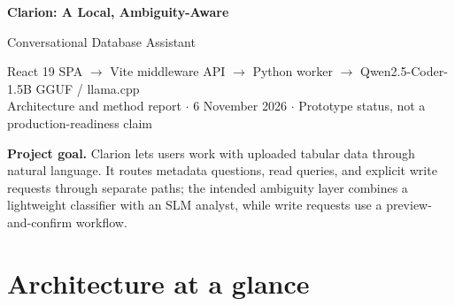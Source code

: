 \documentclass[9pt,a4paper]{extarticle}
\begin{document}
{\color{navy}\sffamily\LARGE\bfseries Clarion: A Local, Ambiguity-Aware\par
Conversational Database Assistant\par}
\vspace{2pt}
{\color{blue}\small React 19 SPA $\rightarrow$ Vite middleware API $\rightarrow$ Python worker $\rightarrow$ Qwen2.5-Coder-1.5B GGUF / llama.cpp\\[-1pt]}
\vspace{3pt}
{\color{slate}\footnotesize Architecture and method report $\cdot$ 6 November 2026 $\cdot$ Prototype status, not a production-readiness claim}

\vspace{4pt}
\colorbox{pale}{\parbox{\dimexpr\linewidth-2\fboxsep\relax}{\small
\textbf{Project goal.} Clarion lets users work with uploaded tabular data through natural language. It routes metadata questions, read queries, and explicit write requests through separate paths; the intended ambiguity layer combines a lightweight classifier with an SLM analyst, while write requests use a preview-and-confirm workflow.}}

\section{Architecture at a glance}

\end{document}
